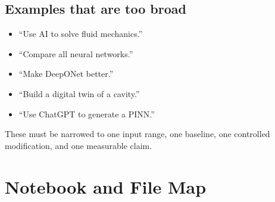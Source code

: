 \documentclass[11pt]{article}
\begin{document}
\subsection{Examples that are too broad}
\begin{itemize}
\item ``Use AI to solve fluid mechanics.''
\item ``Compare all neural networks.''
\item ``Make DeepONet better.''
\item ``Build a digital twin of a cavity.''
\item ``Use ChatGPT to generate a PINN.''
\end{itemize}
These must be narrowed to one input range, one baseline, one controlled modification, and one measurable claim.

\section{Notebook and File Map}
\end{document}
